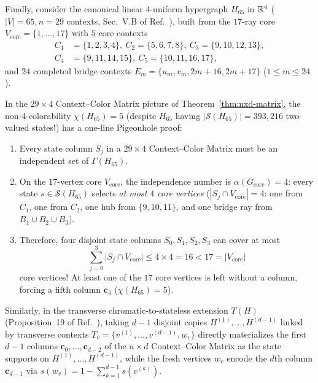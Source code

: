 \documentclass[aps,pra,reprint,superscriptaddress,longbibliography,nofootinbib,floatfix,10pt]{revtex4-2}
\theoremstyle{definition}\newtheorem{definition}[theorem]{Definition}
\theoremstyle{remark}\newtheorem{remark}[theorem]{Remark}
\newcommand{\Sc}{\mathcal S}\newcommand{\Cc}{\mathcal C}
\begin{document}
Finally, consider the canonical linear $4$-uniform hypergraph $H_{65}$ in $\mathbb R^4$ ($|V|=65,n=29$ contexts, Sec.~V.B of Ref.~\cite{svozil-2025-color}), built from the $17$-ray core $V_{\mathrm{core}}=\{1,\ldots,17\}$ with $5$ core contexts
\begin{equation}\label{eq:H65-core}
\begin{aligned}
C_1&=\{1,2,3,4\},\ C_2=\{5,6,7,8\},\ C_3=\{9,10,12,13\},\\
C_4&=\{9,11,14,15\},\ C_5=\{10,11,16,17\},
\end{aligned}
\end{equation}
and $24$ completed bridge contexts $E_m=\{u_m,v_m,2m+16,2m+17\}$ ($1\le m\le 24$).

In the $29\times 4$ Context--Color Matrix picture of Theorem~\ref{thm:nxd-matrix}, the non-4-colorability $\chi(H_{65})=5$ (despite $H_{65}$ having $|\Sc(H_{65})|=393{,}216$ two-valued states!) has a one-line Pigeonhole proof:
\begin{enumerate}
\item Every state column $S_j$ in a $29\times 4$ Context--Color Matrix must be an independent set of $\Gamma(H_{65})$.
\item On the $17$-vertex core $V_{\mathrm{core}}$, the independence number is $\alpha(G_{\mathrm{core}})=4$: every state $s\in\Sc(H_{65})$ selects \emph{at most $4$ core vertices} ($|S_j\cap V_{\mathrm{core}}|=4$: one from $C_1$, one from $C_2$, one hub from $\{9,10,11\}$, and one bridge ray from $B_1\cup B_2\cup B_3$).
\item Therefore, four disjoint state columns $S_0,S_1,S_2,S_3$ can cover at most
\begin{equation}\label{eq:H65-pigeonhole}
\sum_{j=0}^{3}\bigl|S_j\cap V_{\mathrm{core}}\bigr|\le 4\times 4=16 < 17=\bigl|V_{\mathrm{core}}\bigr|
\end{equation}
core vertices! At least one of the $17$ core vertices is left without a column, forcing a fifth column $\mathbf{c}_4$ ($\chi(H_{65})=5$).
\end{enumerate}

Similarly, in the transverse chromatic-to-stateless extension $T(H)$ (Proposition~19 of Ref.~\cite{svozil-2025-color}), taking $d-1$ disjoint copies $H^{(1)},\ldots,H^{(d-1)}$ linked by transverse contexts $T_v=\{v^{(1)},\ldots,v^{(d-1)},w_v\}$ directly materializes the first $d-1$ columns $\mathbf{c}_0,\ldots,\mathbf{c}_{d-2}$ of the $n\times d$ Context--Color Matrix as the state supports on $H^{(1)},\ldots,H^{(d-1)}$, while the fresh vertices $w_v$ encode the $d$th column $\mathbf{c}_{d-1}$ via $s(w_v)=1-\sum_{k=1}^{d-1}s(v^{(k)})$.
\end{document}
